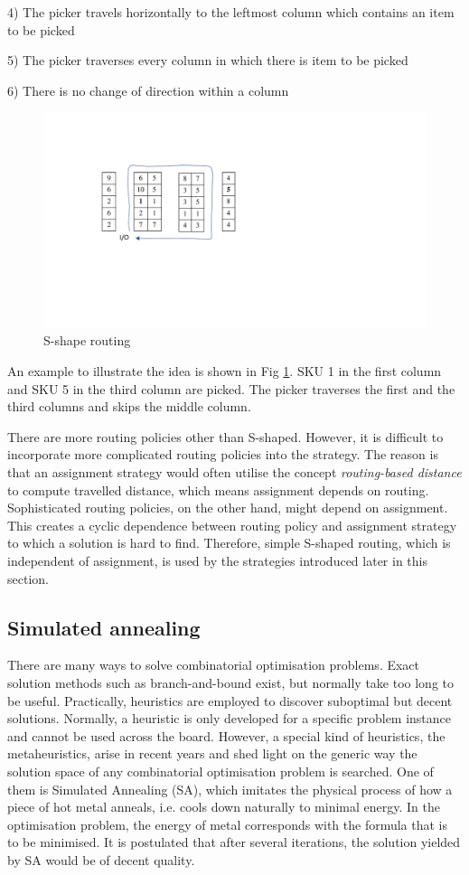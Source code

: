 \documentclass[hyp]{socreport}
\begin{document}
4) The picker travels horizontally to the leftmost column which contains an item to be picked

5) The picker traverses every column in which there is item to be picked

6) There is no change of direction within a column

\begin{figure}
	\includegraphics[scale=0.8]{routing}
	\centering
	\caption{S-shape routing}
	\label{fig1.4}
\end{figure}

An example to illustrate the idea is shown in Fig \ref{fig1.4}. SKU 1 in the first column and SKU 5 in the third column are picked. The picker traverses the first and the third columns and skips the middle column.

There are more routing policies other than S-shaped. However, it is difficult to incorporate more complicated routing policies into the strategy. The reason is that an assignment strategy would often utilise the concept \textit{routing-based distance} to compute travelled distance, which means assignment depends on routing. Sophisticated routing policies, on the other hand, might depend on assignment. This creates a cyclic dependence between routing policy and assignment strategy to which a solution is hard to find. Therefore, simple S-shaped routing, which is independent of assignment, is used by the strategies introduced later in this section.

\subsection{Simulated annealing}
There are many ways to solve combinatorial optimisation problems. Exact solution methods such as branch-and-bound exist, but normally take too long to be useful. Practically, heuristics are employed to discover suboptimal but decent solutions. Normally, a heuristic is only developed for a specific problem instance and cannot be used across the board. However, a special kind of heuristics, the metaheuristics, arise in recent years and shed light on the generic way the solution space of any combinatorial optimisation problem is searched. One of them is Simulated Annealing (SA), which imitates the physical process of how a piece of hot metal anneals, i.e. cools down naturally to minimal energy. In the optimisation problem, the energy of metal corresponds with the formula that is to be minimised. It is postulated that after several iterations, the solution yielded by SA would be of decent quality.
\end{document}
